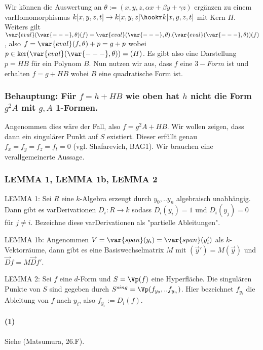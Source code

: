 Wir können die Auswertung an $\theta := (x,y,z,\alpha x + \beta y + \gamma z)$ ergänzen zu einem var{Hom}omorphismus $k[x,y,z,t] \to k[x,y,z] \hookr k[x,y,z,t]$ mit Kern $H$. Weiters gilt $\var{eval}(\var{---},\theta)(f) = \var{eval}(\var{---},\theta).(\var{eval}(\var{---},\theta))(f)$, also $f = \var{eval}(f,\theta) + p = g+p$ wobei $p \in \ker(\var{eval}(\var{---},\theta)) = (H)$.
Es gibt also eine Darstellung $p = HB$ für ein Polynom $B$.
Nun nutzen wir aus, dass $f$ eine $3-Form$ ist und erhalten $f = g+HB$ wobei $B$ eine quadratische Form ist.

\subsubsection{%
Behauptung: Für $f = h + HB$ wie oben hat $h$ nicht die Form $g^2A$ mit $g,A$ 1-Formen.
} %

Angenommen dies wäre der Fall, also $f = g^2A+HB$.
Wir wollen zeigen, dass dann ein singulärer Punkt auf $S$ existiert.
Dieser erfüllt genau $f_x = f_y = f_z = f_t = 0$ (vgl. Shafarevich, BAG1).
Wir brauchen eine verallgemeinerte Aussage.



\subsubsection{LEMMA 1, LEMMA 1b, LEMMA 2}%
LEMMA 1: Sei $R$ eine $k$-Algebra erzeugt durch $y_0,..y_n$ algebraisch unabhängig.
Dann gibt es var{Der}ivationen $D_i : R \to k$ sodass $D_i(y_i) = 1$ und $D_i(y_j) = 0$ für $j\neq i$. Bezeichne diese var{Der}ivationen als "partielle Ableitungen".

LEMMA 1b: Angenommen $V = \var{span}(y_i) = \var{span}(y'_i)$ als $k$-Vektorräume, dann gibt es eine Basiswechselmatrix $M$ mit $(\vec y') = M(\vec y)$ und $\vec Df = M \vec Df'$.

LEMMA 2:
Sei $f$ eine $d$-Form und $S = \Vp(f)$ eine Hyperfläche. Die singulären Punkte von $S$ sind gegeben durch $S^{sing} = \Vp(f_{y_0},..f_{y_n})$. Hier bezeichnet $f_{y_i}$ die Ableitung von $f$ nach $y_i$, also $f_{y_i} := D_i(f)$.

\paragraph{(1)}
Siehe (Matsumura, 26.F).


